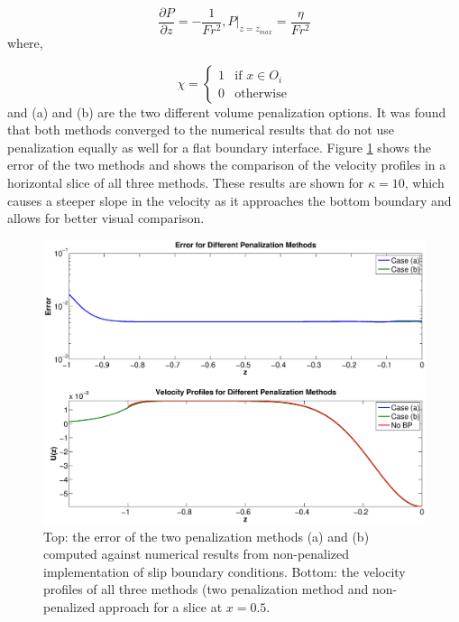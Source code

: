 \begin{equation*}\label{e:hydrostaticpressurepen2}
\frac{\partial P}{\partial z} = -\frac{1}{Fr^{2}}, P|_{z=z_{max}} = \frac{\eta}{Fr^{2}}
\end{equation*}
where,

 \begin{equation*}\label{e:chi}
   \chi=\begin{cases}
   1&\text{if } x \in O_{i}\\
   0&\text{otherwise} \end{cases}
 \end{equation*}
and (a) and (b) are the two different volume penalization options.  It was found that both methods converged to the numerical results that do not use penalization equally as well for a flat boundary interface.  Figure \ref{f:error_diffmeth} shows the error of the two methods and shows the comparison of the velocity profiles in a horizontal slice of all three methods.  These results are shown for $\kappa=10$, which causes a steeper slope in the velocity as it approaches the bottom boundary and allows for better visual comparison.

\begin{center}
\begin{figure}[htp]
\centering
  \includegraphics[width=5 in]{Images/error_diffmeth.eps}
  \caption[Comparison of two Brinkman methods for slip conditions]{Top: the error of the two penalization methods (a) and (b) computed against numerical results from non-penalized implementation of slip boundary conditions. Bottom: the velocity profiles of all three methods (two penalization method and non-penalized approach for a slice at $x=0.5$.}\label{f:error_diffmeth}
\end{figure}
\end{center}


